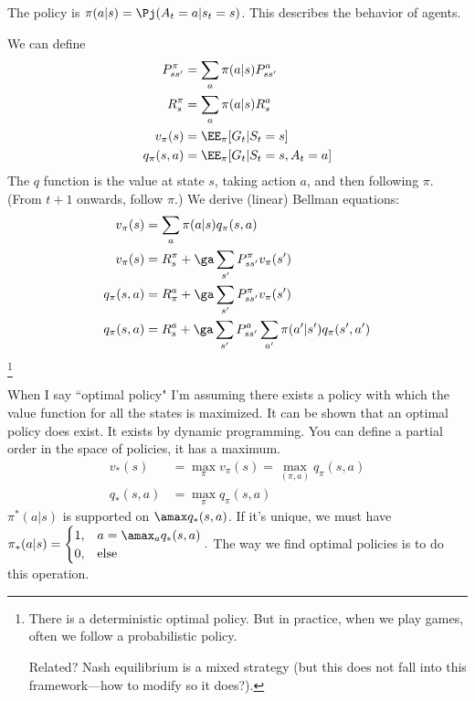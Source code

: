 \begin{enumerate}
The policy is $\pi(a|s) = \Pj(A_t=a|s_t=s)$. This describes the behavior of agents.

We can define 
\begin{align}
P_{ss'}^\pi &= \sum_a\pi(a|s) P_{ss'}^a\\
R_s^\pi &=\sum_a \pi(a|s) R_s^a\\
v_\pi(s) &= \EE_\pi [G_t|S_t=s]\\
q_\pi(s,a) &= \EE_\pi[G_t|S_t=s,A_t=a]
\end{align}
The $q$ function is the value at state $s$, taking action $a$, and then following $\pi$. (From $t+1$ onwards, follow $\pi$.) We derive (linear) Bellman equations:
\begin{align}
v_\pi(s) &= \sum_a \pi(a|s)q_\pi(s,a)\\
v_\pi(s) &= R_s^\pi + \ga\sum_{s'} P_{ss'}^\pi v_\pi(s')\\
q_{\pi}(s,a) &= R_\pi^a + \ga \sum_{s'} P_{ss'}^\pi v_\pi(s')\\
q_\pi(s,a) &= R_s^a + \ga\sum_{s'} P_{ss'}^a \sum_{a'} \pi(a'|s')q_\pi(s',a')
\end{align}
\footnote{
There is a deterministic optimal policy. But in practice, when we play games, often we follow a probabilistic policy. 

Related? Nash equilibrium is a mixed strategy (but this does not fall into this framework---how to modify so it does?).
}
\end{enumerate}
When I say ``optimal policy" I'm assuming there exists a policy with which the value function for all the states is maximized. It can be shown that an optimal policy does exist. It exists by dynamic programming. 
You can define a partial order in the space of policies, it has a maximum.
\begin{align}
v_*(s) &= \max_\pi v_\pi(s) = \max_{(\pi,a)}q_\pi(s,a)\\
q_*(s,a) &= \max_\pi q_\pi(s,a)
\end{align}
$\pi^*(a|s)$ is supported on $\amax q_*(s,a)$. If it's unique, we must have $\pi_*(a|s) = \begin{cases}
1,&a=\amax_a q_*(s,a)\\
0,&\text{else}
\end{cases}.
$
The way we find optimal policies is to do this operation.

